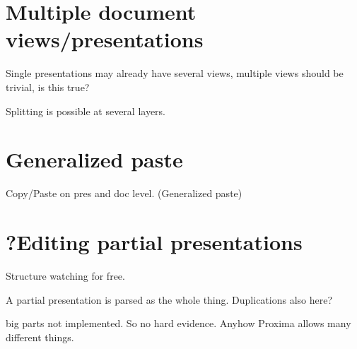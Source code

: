 \section{Multiple document views/presentations}
 
Single presentations may already have several views, multiple views should be trivial, is  this true?

Splitting is possible at several layers.

\section{Generalized paste}    %

Copy/Paste on pres and doc level. (Generalized paste)

\section{?Editing partial presentations}

Structure watching for free.

A partial presentation is parsed as the whole thing. Duplications also here?

big parts not implemented. So no hard evidence. Anyhow Proxima allows many different  things. 
\ec